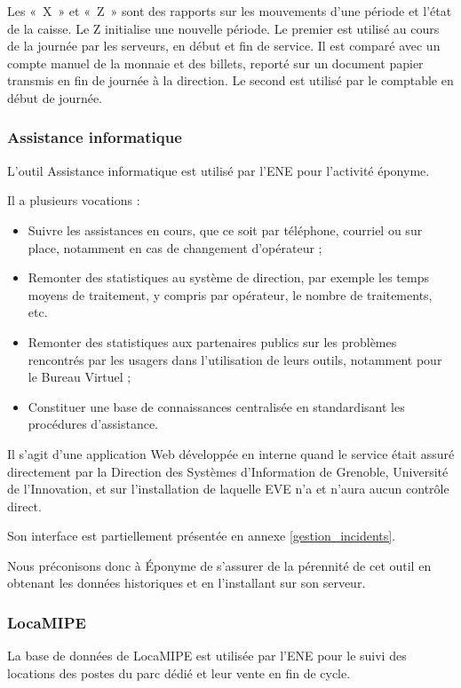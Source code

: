 Les «~X~» et «~Z~» sont des rapports sur les mouvements d'une période et
l'état de la caisse. Le Z initialise une nouvelle période.
Le premier est utilisé au cours de la journée par les serveurs, en début et fin
de service. Il est comparé avec un compte manuel de la monnaie et des billets,
reporté sur un document papier transmis en fin de journée à la direction.
Le second est utilisé par le comptable en début de journée.

\subsubsection{Assistance informatique}

L'outil Assistance informatique est utilisé par l'ENE pour l'activité éponyme.

Il a plusieurs vocations :
\begin{itemize}
\item Suivre les assistances en cours, que ce soit par téléphone,
      courriel ou sur place, notamment en cas de changement d'opérateur ;
\item Remonter des statistiques au système de direction, par exemple les temps
      moyens de traitement, y compris par opérateur, le nombre de traitements,
      etc.
\item Remonter des statistiques aux partenaires publics sur les problèmes
      rencontrés par les usagers dans l'utilisation de leurs outils, notamment
      pour le Bureau Virtuel ;
\item Constituer une base de connaissances centralisée en standardisant les
      procédures d'assistance.
\end{itemize}

Il s'agit d'une application Web développée en interne quand le service était
assuré directement par la Direction des Systèmes d'Information de Grenoble,
Université de l'Innovation, et sur l'installation de laquelle EVE n'a et
n'aura aucun contrôle direct.

Son interface est partiellement présentée en annexe \ref{gestion_incidents}.

Nous préconisons donc à Éponyme de s'assurer de la pérennité de cet outil
en obtenant les données historiques et en l'installant sur son serveur.

\subsubsection{LocaMIPE}

La base de données de LocaMIPE est utilisée par l'ENE pour le suivi des
locations des postes du parc dédié et leur vente en fin de cycle.

